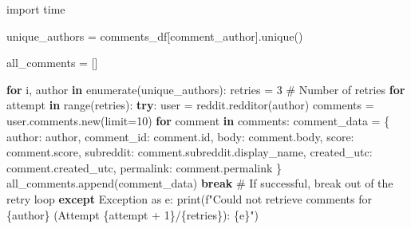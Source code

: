 \documentclass[
  12pt,
  letterpaper,
  DIV=11,
  numbers=noendperiod]{scrartcl}
\newenvironment{Shaded}{\begin{snugshade}}{\end{snugshade}}
\newcommand{\BuiltInTok}[1]{\textcolor[rgb]{0.00,0.23,0.31}{#1}}
\newcommand{\CommentTok}[1]{\textcolor[rgb]{0.37,0.37,0.37}{#1}}
\newcommand{\ControlFlowTok}[1]{\textcolor[rgb]{0.00,0.23,0.31}{\textbf{#1}}}
\newcommand{\DecValTok}[1]{\textcolor[rgb]{0.68,0.00,0.00}{#1}}
\newcommand{\ImportTok}[1]{\textcolor[rgb]{0.00,0.46,0.62}{#1}}
\newcommand{\KeywordTok}[1]{\textcolor[rgb]{0.00,0.23,0.31}{\textbf{#1}}}
\newcommand{\NormalTok}[1]{\textcolor[rgb]{0.00,0.23,0.31}{#1}}
\newcommand{\OperatorTok}[1]{\textcolor[rgb]{0.37,0.37,0.37}{#1}}
\newcommand{\PreprocessorTok}[1]{\textcolor[rgb]{0.68,0.00,0.00}{#1}}
\newcommand{\SpecialCharTok}[1]{\textcolor[rgb]{0.37,0.37,0.37}{#1}}
\newcommand{\SpecialStringTok}[1]{\textcolor[rgb]{0.13,0.47,0.30}{#1}}
\newcommand{\StringTok}[1]{\textcolor[rgb]{0.13,0.47,0.30}{#1}}
\begin{document}
\begin{Shaded}
\begin{Highlighting}[]
\ImportTok{import}\NormalTok{ time}

\NormalTok{unique\_authors }\OperatorTok{=}\NormalTok{ comments\_df[}\StringTok{\textquotesingle{}comment\_author\textquotesingle{}}\NormalTok{].unique()}

\NormalTok{all\_comments }\OperatorTok{=}\NormalTok{ []}

\ControlFlowTok{for}\NormalTok{ i, author }\KeywordTok{in} \BuiltInTok{enumerate}\NormalTok{(unique\_authors):}
\NormalTok{    retries }\OperatorTok{=} \DecValTok{3}  \CommentTok{\# Number of retries}
    \ControlFlowTok{for}\NormalTok{ attempt }\KeywordTok{in} \BuiltInTok{range}\NormalTok{(retries):}
        \ControlFlowTok{try}\NormalTok{:}
\NormalTok{            user }\OperatorTok{=}\NormalTok{ reddit.redditor(author)}
\NormalTok{            comments }\OperatorTok{=}\NormalTok{ user.comments.new(limit}\OperatorTok{=}\DecValTok{10}\NormalTok{)}
            \ControlFlowTok{for}\NormalTok{ comment }\KeywordTok{in}\NormalTok{ comments:}
\NormalTok{                comment\_data }\OperatorTok{=}\NormalTok{ \{}
                    \StringTok{\textquotesingle{}author\textquotesingle{}}\NormalTok{: author,}
                    \StringTok{\textquotesingle{}comment\_id\textquotesingle{}}\NormalTok{: comment.}\BuiltInTok{id}\NormalTok{,}
                    \StringTok{\textquotesingle{}body\textquotesingle{}}\NormalTok{: comment.body,}
                    \StringTok{\textquotesingle{}score\textquotesingle{}}\NormalTok{: comment.score,}
                    \StringTok{\textquotesingle{}subreddit\textquotesingle{}}\NormalTok{: comment.subreddit.display\_name,}
                    \StringTok{\textquotesingle{}created\_utc\textquotesingle{}}\NormalTok{: comment.created\_utc,}
                    \StringTok{\textquotesingle{}permalink\textquotesingle{}}\NormalTok{: comment.permalink}
\NormalTok{                \}}
\NormalTok{                all\_comments.append(comment\_data)}
            \ControlFlowTok{break}  \CommentTok{\# If successful, break out of the retry loop}
        \ControlFlowTok{except} \PreprocessorTok{Exception} \ImportTok{as}\NormalTok{ e:}
            \BuiltInTok{print}\NormalTok{(}\SpecialStringTok{f"Could not retrieve comments for }\SpecialCharTok{\{}\NormalTok{author}\SpecialCharTok{\}}\SpecialStringTok{ (Attempt }\SpecialCharTok{\{}\NormalTok{attempt }\OperatorTok{+} \DecValTok{1}\SpecialCharTok{\}}\SpecialStringTok{/}\SpecialCharTok{\{}\NormalTok{retries}\SpecialCharTok{\}}\SpecialStringTok{): }\SpecialCharTok{\{}\NormalTok{e}\SpecialCharTok{\}}\SpecialStringTok{"}\NormalTok{)}

\end{Highlighting}
\end{Shaded}
\end{document}

